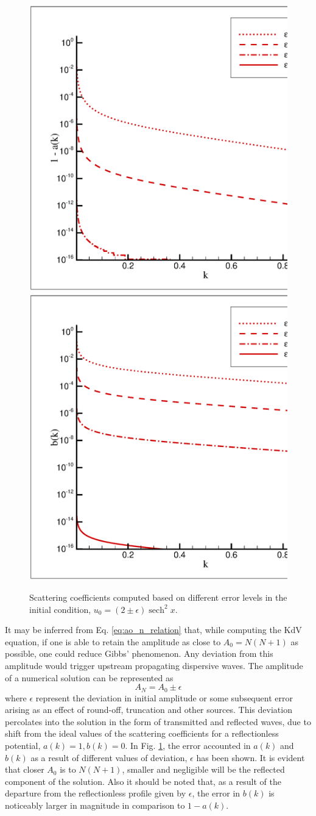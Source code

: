 \documentclass{svjour3}                    %
\DeclareMathOperator{\sech}{sech}
\begin{document}
\begin{figure}[h!]
\centerline{
\includegraphics[width=0.5\linewidth]{Fig_3a}
\includegraphics[width=0.5\linewidth]{Fig_3b}
}
\caption{Scattering coefficients computed based on different error levels in the initial condition, $u_0=(2 \pm \epsilon)\sech^2x$.}
\label{fig:akbk}
\end{figure}

It may be inferred from Eq. \eqref{eq:ao_n_relation} that, while computing the KdV equation, if one is able to retain the amplitude as close to $A_0 = N(N+1)$ as possible, one could reduce Gibbs' phenomenon. Any deviation from this amplitude would trigger upstream propagating dispersive waves. The amplitude of a numerical solution can be represented as
$$ A_N = A_0 \pm \epsilon $$
where $\epsilon$ represent the deviation in initial amplitude or some subsequent error arising as an effect of round-off, truncation and other sources. This deviation percolates into the solution in the form of transmitted and reflected waves, due to shift from the ideal values of the scattering coefficients for a reflectionless potential, $a(k)=1,b(k)=0$. In Fig. \ref{fig:akbk}, the error accounted in $a(k)$ and $b(k)$ as a result of different values of deviation, $\epsilon$ has been shown. It is evident that closer $A_0$ is to $N(N+1)$, smaller and negligible will be the reflected component 
of the solution. Also it should be noted that, as a result of the departure from the reflectionless profile given by $\epsilon$, the error in $b(k)$ is noticeably larger in magnitude in comparison to $1- a(k)$.
\end{document}
